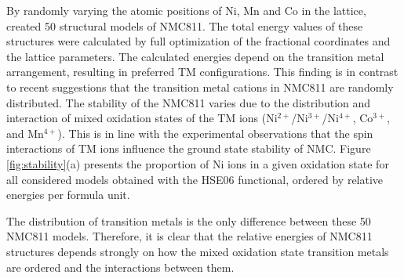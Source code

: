 \documentclass[journal=jacsat,manuscript=article]{achemso}
\newcommand{\re}[1]{\textcolor{red}{#1}}
\begin{document}
By randomly varying the atomic positions of Ni, Mn and Co in the lattice, \re{\citeauthor{rana}} created 50 structural models of NMC811. The total energy values of these structures were calculated by full optimization of the fractional coordinates and the lattice parameters. The calculated energies depend on the transition metal arrangement, resulting in preferred TM configurations. This finding is in contrast to recent suggestions that the transition metal cations in NMC811 are randomly distributed. \cite{Sun_JPhysChemC2017} The stability of the NMC811 varies due to the distribution and interaction of mixed oxidation states of the TM ions (Ni$^{2+}$/Ni$^{3+}$/Ni$^{4+}$, Co$^{3+}$, and Mn$^{4+}$). This is in line with the experimental observations that the spin interactions of TM ions influence the ground state stability of NMC. \cite{Xiao_NanoEner2018}  Figure \ref{fig:stability}(a) presents the proportion of Ni ions in a given oxidation state for all considered models obtained with the HSE06 functional, ordered by relative energies per formula unit. \cite{rana} 

The distribution of transition metals is the only difference between these 50 NMC811 models. Therefore, it is clear that the relative energies of NMC811 structures depends strongly on how the mixed oxidation state transition metals are ordered and the interactions between them.
\end{document}
